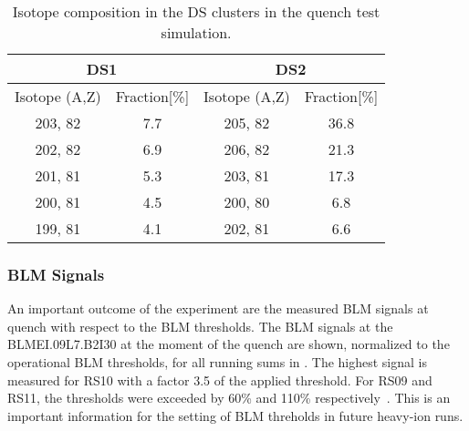 \begin{table}[h]
  \centering
  \caption{Isotope composition in the DS clusters in the quench test simulation.}
  \begin{tabular}{cccc}
		\toprule
                \multicolumn{2}{c}{DS1} & \multicolumn{2}{c}{DS2} \\ \midrule
		Isotope (A,Z) & Fraction{[}\%{]} & Isotope (A,Z) & Fraction{[}\%{]} \\ \midrule
		203, 82       & 7.7              & 205, 82       & 36.8 \\
		202, 82       & 6.9              & 206, 82       & 21.3 \\
		201, 81       & 5.3              & 203, 81       & 17.3 \\
		200, 81       & 4.5              & 200, 80       & 6.8  \\
		199, 81       & 4.1              & 202, 81       & 6.6  \\ \bottomrule
  \end{tabular}
\end{table}




\subsubsection{BLM Signals}

An important outcome of the experiment are the measured BLM signals at quench with respect to the BLM thresholds. The BLM signals at the BLMEI.09L7.B2I30 at the moment of the quench are shown, normalized to the operational BLM thresholds, for all running sums in . The highest signal is measured for RS10 with a factor 3.5 of the applied threshold. For RS09 and RS11, the thresholds were exceeded by 60\% and 110\% respectively~\cite{ACC-NOTE-16-0031}. This is an important information for the setting of BLM threholds in future heavy-ion runs. 



